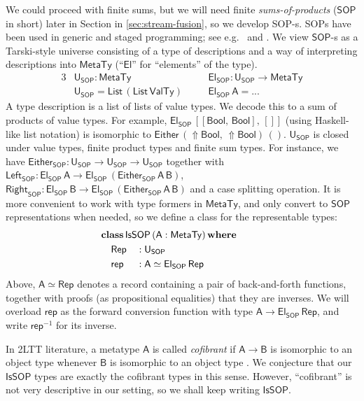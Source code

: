 \documentclass[acmsmall,screen]{acmart}
\newcommand{\mit}[1]{{\mathsf{#1}}}
\newcommand{\msf}[1]{{\mathsf{#1}}}
\newcommand{\mbf}[1]{{\mathbf{#1}}}
\newcommand{\ind}{\hspace{1em}}
\newcommand{\where}{\mbf{where}}
\newcommand{\vA}{\mathsf{A}}
\newcommand{\vB}{\mathsf{B}}
\newcommand{\SOP}{\msf{SOP}}
\newcommand{\El}{\msf{El}}
\newcommand{\USOP}{\msf{U}_{\msf{SOP}}}
\newcommand{\IsSOP}{\msf{IsSOP}}
\newcommand{\List}{\msf{List}}
\newcommand{\Bool}{\msf{Bool}}
\newcommand{\Lift}{{\Uparrow}}
\newcommand{\MTy}{\msf{MetaTy}}
\newcommand{\VTy}{\msf{ValTy}}
\theoremstyle{remark}
\newcommand{\tyclass}{\mbf{class}}
\newcommand{\Either}{\msf{Either}}
\newcommand{\Left}{\msf{Left}}
\newcommand{\Right}{\msf{Right}}
\newcommand{\Rep}{\mit{Rep}}
\begin{document}
We could proceed with finite sums, but we will need finite
\emph{sums-of-products} ($\SOP$ in short) later in Section in
\ref{sec:stream-fusion}, so we develop SOP-s. SOPs have been used in generic and
staged programming; see e.g.\ \cite{sop} and
\cite{DBLP:conf/haskell/PickeringLW20}. We view $\SOP$-s as a Tarski-style
universe consisting of a type of descriptions and a way of interpreting
descriptions into $\MTy$ (``$\El$'' for ``elements'' of the type).
\begin{alignat*}{3}
  &\USOP : \MTy                    &&\ind \El_\SOP : \USOP \to \MTy \\
  &\USOP = \List\,(\List\,\VTy)    &&\ind \El_\SOP\,\vA = ...
\end{alignat*}
A type description is a list of lists of value types. We decode this to a sum of
products of value types. For example, $\El_\SOP\,[[\Bool,\,\Bool],\,[]]$ (using
Haskell-like list notation) is isomorphic to $\Either\,(\Lift\Bool,\,\Lift\Bool)\,()$.
$\USOP$ is closed under
value types, finite product types and finite sum types. For instance, we have
$\Either_\SOP : \USOP \to \USOP \to \USOP$ together with $\Left_\SOP : \El_\SOP\,\vA
\to \El_\SOP\,(\Either_\SOP\,\vA\,\vB)$, $\Right_\SOP : \El_\SOP\,\vB \to
\El_\SOP\,(\Either_\SOP\,\vA\,\vB)$ and a case splitting operation. It is more
convenient to work with type formers in $\MTy$, and only convert to $\SOP$
representations when needed, so we define a class for the representable types:
\begin{alignat*}{3}
  & \hspace{-5em}\mathrlap{\tyclass\,\IsSOP\,(\vA : \MTy)\,\where} \\
  & \hspace{-5em}\ind \Rep      &&: \USOP \\
  & \hspace{-5em}\ind \mit{rep} &&: \vA \simeq \El_\SOP\,\Rep
\end{alignat*}
Above, $\vA \simeq \Rep$ denotes a record containing a pair of back-and-forth
functions, together with proofs (as propositional equalities) that they are
inverses. We will overload $\mit{rep}$ as the forward conversion function with
type $\vA \to \El_\SOP\,\Rep$, and write $\mit{rep}^{-1}$ for its inverse.

In 2LTT literature, a metatype $\vA$ is called \emph{cofibrant} if $\vA \to \vB$ is
isomorphic to an object type whenever $\vB$ is isomorphic to an object type
\cite{twolevel}. We conjecture that our $\IsSOP$ types are exactly the cofibrant
types in this sense. However, ``cofibrant'' is not very descriptive in our
setting, so we shall keep writing $\IsSOP$.
\end{document}
